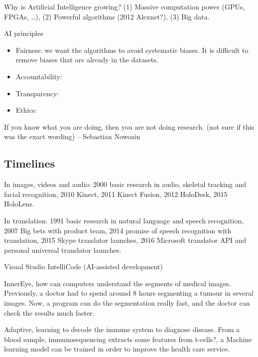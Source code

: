 Why is Artificial Intelligence growing? (1) Massive computation power (GPUs,
FPGAs, \dots), (2) Powerful algorithms (2012 Alexnet?), (3) Big data.

AI principles

\begin{itemize}
  \item Fairness: we want the algorithms to avoid systematic biases. It is
    difficult to remove biases that are already in the datasets.
  \item Accountability:
  \item Transparency:
  \item Ethics:
\end{itemize}

\begin{mybox}
  If you know what you are doing, then you are not doing research. (not sure if
  this was the exact wording) -- Sebastian Nowozin
\end{mybox}

\subsection{Timelines}

In images, videos and audio: 2000 basic research in audio, skeletal tracking
and facial recognition, 2010 Kinect, 2011 Kinect Fusion, 2012 HoloDesk, 2015
HoloLens.

In translation: 1991 basic research in natural language and speech recognition,
2007 Big bets with product team, 2014 promise of speech recognition with
translation, 2015 Skype translator launches, 2016 Microsoft translator API and
personal universal translator launches.

Visual Studio IntelliCode (AI-assisted development)

InnerEye, how can computers understand the segments of medical images.
Previously, a doctor had to spend around 8 hours segmenting a tumour in several
images. Now, a program can do the segmentation really fast, and the doctor can
check the results much faster.

Adaptive, learning to decode the immune system to diagnose disease. From a
blood sample, immunosequencing extracts some features from t-cells?, a Machine
learning model can be trained in order to improve the health care service.


